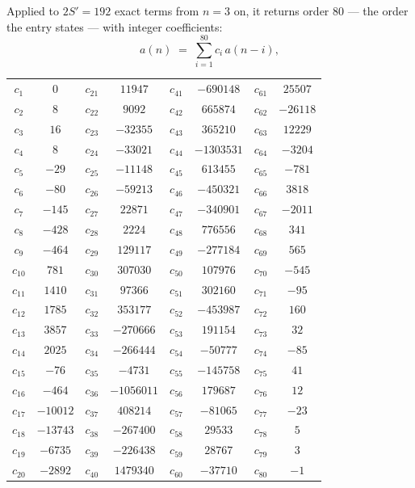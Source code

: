 \documentclass[11pt,a4paper]{article}
\theoremstyle{plain}
\theoremstyle{definition}
\begin{document}
Applied to $2S'=192$ exact terms from $n=3$ on, it returns order $80$ --- the
order the entry states --- with integer coefficients:
\[
a(n)\;=\;\sum_{i=1}^{80}c_i\,a(n-i),
\]
\begin{center}\small
\begin{tabular}{cccccccc}
$c_{1}$ & $0$ & $c_{21}$ & $11947$ & $c_{41}$ & $-690148$ & $c_{61}$ & $25507$ \\
$c_{2}$ & $8$ & $c_{22}$ & $9092$ & $c_{42}$ & $665874$ & $c_{62}$ & $-26118$ \\
$c_{3}$ & $16$ & $c_{23}$ & $-32355$ & $c_{43}$ & $365210$ & $c_{63}$ & $12229$ \\
$c_{4}$ & $8$ & $c_{24}$ & $-33021$ & $c_{44}$ & $-1303531$ & $c_{64}$ & $-3204$ \\
$c_{5}$ & $-29$ & $c_{25}$ & $-11148$ & $c_{45}$ & $613455$ & $c_{65}$ & $-781$ \\
$c_{6}$ & $-80$ & $c_{26}$ & $-59213$ & $c_{46}$ & $-450321$ & $c_{66}$ & $3818$ \\
$c_{7}$ & $-145$ & $c_{27}$ & $22871$ & $c_{47}$ & $-340901$ & $c_{67}$ & $-2011$ \\
$c_{8}$ & $-428$ & $c_{28}$ & $2224$ & $c_{48}$ & $776556$ & $c_{68}$ & $341$ \\
$c_{9}$ & $-464$ & $c_{29}$ & $129117$ & $c_{49}$ & $-277184$ & $c_{69}$ & $565$ \\
$c_{10}$ & $781$ & $c_{30}$ & $307030$ & $c_{50}$ & $107976$ & $c_{70}$ & $-545$ \\
$c_{11}$ & $1410$ & $c_{31}$ & $97366$ & $c_{51}$ & $302160$ & $c_{71}$ & $-95$ \\
$c_{12}$ & $1785$ & $c_{32}$ & $353177$ & $c_{52}$ & $-453987$ & $c_{72}$ & $160$ \\
$c_{13}$ & $3857$ & $c_{33}$ & $-270666$ & $c_{53}$ & $191154$ & $c_{73}$ & $32$ \\
$c_{14}$ & $2025$ & $c_{34}$ & $-266444$ & $c_{54}$ & $-50777$ & $c_{74}$ & $-85$ \\
$c_{15}$ & $-76$ & $c_{35}$ & $-4731$ & $c_{55}$ & $-145758$ & $c_{75}$ & $41$ \\
$c_{16}$ & $-464$ & $c_{36}$ & $-1056011$ & $c_{56}$ & $179687$ & $c_{76}$ & $12$ \\
$c_{17}$ & $-10012$ & $c_{37}$ & $408214$ & $c_{57}$ & $-81065$ & $c_{77}$ & $-23$ \\
$c_{18}$ & $-13743$ & $c_{38}$ & $-267400$ & $c_{58}$ & $29533$ & $c_{78}$ & $5$ \\
$c_{19}$ & $-6735$ & $c_{39}$ & $-226438$ & $c_{59}$ & $28767$ & $c_{79}$ & $3$ \\
$c_{20}$ & $-2892$ & $c_{40}$ & $1479340$ & $c_{60}$ & $-37710$ & $c_{80}$ & $-1$ \\
\end{tabular}
\end{center}
\end{document}

